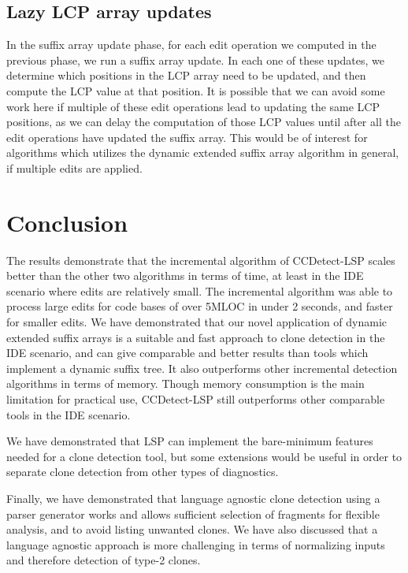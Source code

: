 \subsection*{Lazy LCP array updates}

In the suffix array update phase, for each edit operation we computed in the previous
phase, we run a suffix array update. In each one of these updates, we determine which
positions in the LCP array need to be updated, and then compute the LCP value at that
position. It is possible that we can avoid some work here if multiple of these edit
operations lead to updating the same LCP positions, as we can delay the computation of
those LCP values until after all the edit operations have updated the suffix array. This
would be of interest for algorithms which utilizes the dynamic extended suffix array
algorithm in general, if multiple edits are applied.

\section{Conclusion}

The results demonstrate that the incremental algorithm of CCDetect-LSP scales better than
the other two algorithms in terms of time, at least in the IDE scenario where edits are
relatively small. The incremental algorithm was able to process large edits for code bases
of over 5MLOC in under 2 seconds, and faster for smaller edits. We have demonstrated that
our novel application of dynamic extended suffix arrays is a suitable and fast approach to
clone detection in the IDE scenario, and can give comparable and better results than tools
which implement a dynamic suffix tree. It also outperforms other incremental detection
algorithms in terms of memory. Though memory consumption is the main limitation for
practical use, CCDetect-LSP still outperforms other comparable tools in the IDE scenario.

We have demonstrated that LSP can implement the bare-minimum features needed for a clone
detection tool, but some extensions would be useful in order to separate clone detection
from other types of diagnostics.

Finally, we have demonstrated that language agnostic clone detection using a parser
generator works and allows sufficient selection of fragments for flexible analysis, and to
avoid listing unwanted clones. We have also discussed that a language agnostic approach is
more challenging in terms of normalizing inputs and therefore detection of type-2 clones.
